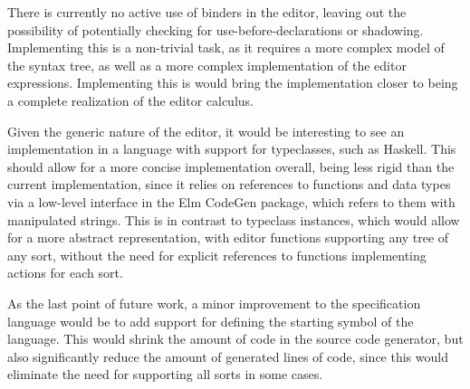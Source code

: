 There is currently no active use of binders in the editor, leaving
out the possibility of potentially checking for use-before-declarations or
shadowing. Implementing this is a non-trivial task, as it requires a more
complex model of the syntax tree, as well as a more complex implementation of the editor expressions. Implementing this is would bring the implementation
closer to being a complete realization of the editor calculus.

Given the generic nature of the editor, it would be interesting to see
an implementation in a language with support for typeclasses, such as Haskell.
This should allow for a more concise implementation overall, being less rigid
than the current implementation, since it relies on references to functions and
data types via a low-level interface in the Elm CodeGen package, which refers
to them with manipulated strings. This is in contrast to typeclass
instances, which would allow for a more abstract representation, with editor functions supporting any tree of any sort, without the need for explicit references to functions implementing actions for each sort.

As the last point of future work, a minor improvement to the specification
language would be to add support for defining the starting symbol of the
language. This would shrink the amount of code in the
source code generator, but also significantly reduce the amount of generated lines of code, since this would eliminate the need for supporting all
sorts in some cases.
